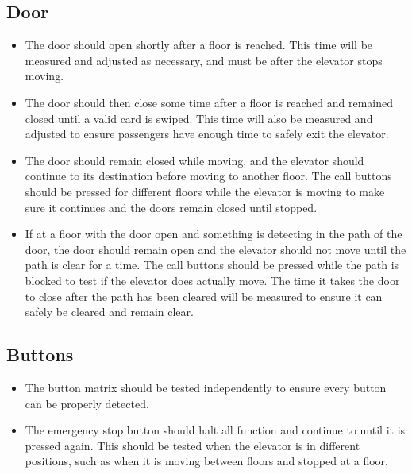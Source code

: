 \documentclass{article}
\begin{document}
	    \subsection{Door}
	    \begin{itemize}
	        \item The door should open shortly after a floor is reached. This time will be measured and adjusted as necessary, and must be after the elevator stops moving.
	        \item The door should then close some time after a floor is reached and remained closed until a valid card is swiped. This time will also be measured and adjusted to ensure passengers have enough time to safely exit the elevator.
	        \item The door should remain closed while moving, and the elevator should continue to its destination before moving to another floor. The call buttons should be pressed for different floors while the elevator is moving to make sure it continues and the doors remain closed until stopped.
	        \item If at a floor with the door open and something is detecting in the path of the door, the door should remain open and the elevator should not move until the path is clear for a time. The call buttons should be pressed while the path is blocked to test if the elevator does actually move. The time it takes the door to close after the path has been cleared will be measured to ensure it can safely be cleared and remain clear.
	    \end{itemize}
	    
	    \subsection{Buttons}
	    \begin{itemize}
	        \item The button matrix should be tested independently to ensure every button can be properly detected.
	        \item The emergency stop button should halt all function and continue to until it is pressed again. This should be tested when the elevator is in different positions, such as when it is moving between floors and stopped at a floor.
	    \end{itemize}
        
\end{document}
